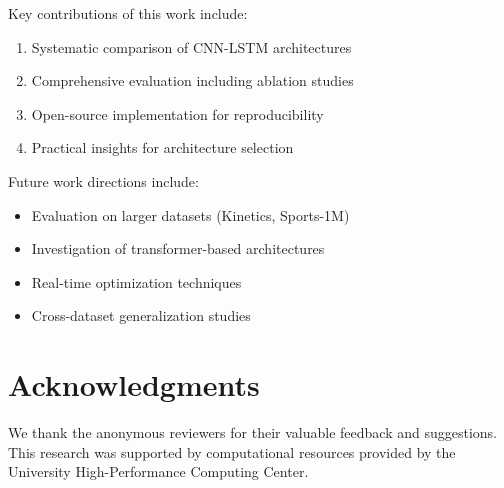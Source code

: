 \documentclass[twocolumn]{article}
\begin{document}
Key contributions of this work include:
\begin{enumerate}
    \item Systematic comparison of CNN-LSTM architectures
    \item Comprehensive evaluation including ablation studies
    \item Open-source implementation for reproducibility
    \item Practical insights for architecture selection
\end{enumerate}

Future work directions include:
\begin{itemize}
    \item Evaluation on larger datasets (Kinetics, Sports-1M)
    \item Investigation of transformer-based architectures
    \item Real-time optimization techniques
    \item Cross-dataset generalization studies
\end{itemize}

\section{Acknowledgments}
We thank the anonymous reviewers for their valuable feedback and suggestions. This research was supported by computational resources provided by the University High-Performance Computing Center.
\end{document}
